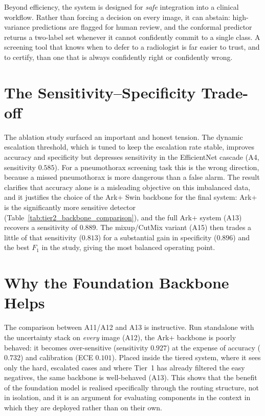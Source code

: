 Beyond efficiency, the system is designed for \emph{safe} integration into a clinical workflow. Rather than forcing a decision on every image, it can abstain: high-variance predictions are flagged for human review, and the conformal predictor returns a two-label set whenever it cannot confidently commit to a single class. A screening tool that knows when to defer to a radiologist is far easier to trust, and to certify, than one that is always confidently right or confidently wrong.

\section{The Sensitivity--Specificity Trade-off}
The ablation study surfaced an important and honest tension. The dynamic escalation threshold, which is tuned to keep the escalation rate stable, improves accuracy and specificity but depresses sensitivity in the EfficientNet cascade (A4, sensitivity $0.585$). For a pneumothorax screening task this is the wrong direction, because a missed pneumothorax is more dangerous than a false alarm. The result clarifies that accuracy alone is a misleading objective on this imbalanced data, and it justifies the choice of the Ark+ Swin backbone for the final system: Ark+ is the significantly more sensitive detector (Table~\ref{tab:tier2_backbone_comparison}), and the full Ark+ system (A13) recovers a sensitivity of $0.889$. The mixup/CutMix variant (A15) then trades a little of that sensitivity ($0.813$) for a substantial gain in specificity ($0.896$) and the best $F_1$ in the study, giving the most balanced operating point.

\section{Why the Foundation Backbone Helps}
The comparison between A11/A12 and A13 is instructive. Run standalone with the uncertainty stack on \emph{every} image (A12), the Ark+ backbone is poorly behaved: it becomes over-sensitive (sensitivity $0.927$) at the expense of accuracy ($0.732$) and calibration (ECE $0.101$). Placed inside the tiered system, where it sees only the hard, escalated cases and where Tier~1 has already filtered the easy negatives, the same backbone is well-behaved (A13). This shows that the benefit of the foundation model is realised specifically through the routing structure, not in isolation, and it is an argument for evaluating components in the context in which they are deployed rather than on their own.

